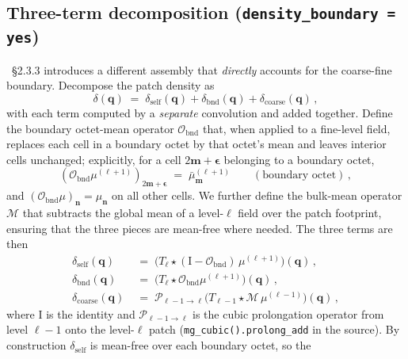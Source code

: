 \documentclass[12pt]{article}
\newcommand{\bq}{\mathbf{q}}
\newcommand{\bn}{\mathbf{n}}
\newcommand{\bm}{\mathbf{m}}
\newcommand{\code}[1]{\texttt{#1}}
\begin{document}
\subsection{Three-term decomposition (\code{density\_boundary = yes})}
\label{sec:delta-three-term}

\citet{Hahn2011}~\S2.3.3 introduces a different assembly that
\emph{directly} accounts for the coarse-fine boundary.  Decompose
the patch density as
\begin{equation}
  \delta(\bq) \;=\; \delta_\mathrm{self}(\bq)
                  + \delta_\mathrm{bnd}(\bq)
                  + \delta_\mathrm{coarse}(\bq)\,,
  \label{eq:three-term}
\end{equation}
with each term computed by a \emph{separate} convolution and added
together.  Define the boundary octet-mean operator $\mathcal{O}_\mathrm{bnd}$
that, when applied to a fine-level field, replaces each cell in a
boundary octet by that octet's mean and leaves interior cells
unchanged; explicitly, for a cell $2\bm + \boldsymbol\epsilon$
belonging to a boundary octet,
\begin{equation}
  (\mathcal{O}_\mathrm{bnd}\mu^{(\ell+1)})_{2\bm+\boldsymbol\epsilon}
   \;=\; \bar\mu^{(\ell+1)}_\bm
  \qquad (\text{boundary octet})\,,
  \label{eq:Obnd-def}
\end{equation}
and $(\mathcal{O}_\mathrm{bnd}\mu)_\bn = \mu_\bn$ on all other
cells.  We further define the bulk-mean operator
$\mathcal{M}$ that subtracts the global mean of a level-$\ell$
field over the patch footprint, ensuring that the three pieces are
mean-free where needed.  The three terms are then
\begin{align}
  \delta_\mathrm{self}(\bq)
    \;&=\; \bigl(T_\ell \star (\mathrm{I} - \mathcal{O}_\mathrm{bnd})\,\mu^{(\ell+1)}\bigr)(\bq)\,,
    \label{eq:delta-self}\\[4pt]
  \delta_\mathrm{bnd}(\bq)
    \;&=\; \bigl(T_\ell \star \mathcal{O}_\mathrm{bnd}\mu^{(\ell+1)}\bigr)(\bq)\,,
    \label{eq:delta-bnd}\\[4pt]
  \delta_\mathrm{coarse}(\bq)
    \;&=\; \mathcal{P}_{\ell-1 \to \ell}\!\bigl(T_{\ell-1} \star \mathcal{M}\,\mu^{(\ell-1)}\bigr)(\bq)\,,
    \label{eq:delta-coarse}
\end{align}
where $\mathrm{I}$ is the identity and
$\mathcal{P}_{\ell-1\to\ell}$ is the cubic prolongation operator
from level $\ell-1$ onto the level-$\ell$ patch
(\code{mg\_cubic().prolong\_add} in the source).  By construction
$\delta_\mathrm{self}$ is mean-free over each boundary octet, so the
\end{document}
